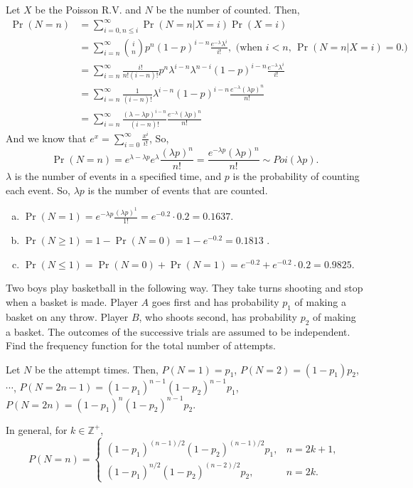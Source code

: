 \documentclass[14pt]{elegantbook}
\begin{document}
    \begin{solution}
        Let $X$ be the Poisson R.V. and $N$ be the number of counted. Then, 
        \begin{align*}
            \Pr(N=n)&=\sum_{i=0, n\leq i}^\infty \Pr(N=n|X=i)\Pr(X=i)\\
            &=\sum_{i=n}^\infty \binom{i}{n}p^n(1-p)^{i-n}\frac{e^{-\lambda}\lambda^i}{i!}, \text{ (when $i<n$, $\Pr(N=n|X=i)=0$.)}\\
            &=\sum_{i=n}^\infty \frac{i!}{n!(i-n)!}p^n\lambda^{i-n}\lambda^{n-i}(1-p)^{i-n}\frac{e^{-\lambda}\lambda^{i}}{i!}\\
            &=\sum_{i=n}^\infty \frac{1}{(i-n)!}\lambda^{i-n}(1-p)^{i-n}\frac{e^{-\lambda}(\lambda p)^{n}}{n!}\\
            &=\sum_{i=n}^\infty \frac{(\lambda-\lambda p)^{i-n}}{(i-n)!}\frac{e^{-\lambda}(\lambda p)^{n}}{n!}
        \end{align*}
        And we know that $e^x=\sum_{i=0}^\infty\frac{x^i}{i!}$, So, 
        \[
            \Pr(N=n)=e^{\lambda-\lambda p}e^{\lambda}\frac{(\lambda p)^n}{n!}=\frac{e^{-\lambda p}(\lambda p)^n}{n!}\sim Poi(\lambda p). 
        \]
        $\lambda$ is the number of events in a specified time, and $p$ is the probability of counting each event. So, $\lambda p$ is the number of events that are counted. 
        \begin{enumerate}[(a)]
            \item $\Pr(N=1)=e^{-\lambda p}\frac{(\lambda p)^1}{1!}=e^{-0.2}\cdot 0.2=0.1637$. 
            \item $\Pr(N\geq 1)=1-\Pr(N=0)=1-e^{-0.2}=0.1813$ . 
            \item $\Pr(N\leq 1)=\Pr(N=0)+\Pr(N=1)=e^{-0.2}+e^{-0.2}\cdot 0.2=0.9825$.
        \end{enumerate}
    \end{solution}

    \begin{exercise*}[5]
        Two boys play basketball in the following way. They take turns shooting and stop when a basket is made. Player $A$ goes first and has probability $p_1$ of making a basket on any throw. Player $B$, who shoots second, has probability $p_2$ of making a basket. The outcomes of the successive trials are assumed to be independent. Find the frequency function for the total number of attempts. 
    \end{exercise*}

    \begin{solution}
        Let $N$ be the attempt times. Then, 
        $P(N=1)=p_1$, $P(N=2)=(1-p_1)p_2$, $\cdots$, $P(N=2n-1)=(1-p_1)^{n-1}(1-p_2)^{n-1}p_1$, $P(N=2n)=(1-p_1)^n(1-p_2)^{n-1}p_2$. 

        In general, for $k\in\mathbb{Z}^+$, 
        \[
            P(N=n)=\left\{ \begin{matrix}
                (1-p_1)^{(n-1)/2}(1-p_2)^{(n-1)/2}p_1, & n=2k+1, \\
                (1-p_1)^{n/2}(1-p_2)^{(n-2)/2}p_2, & n=2k. 
            \end{matrix} \right.
        \]
    \end{solution}

    
\end{document}
